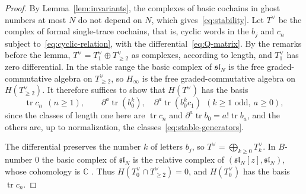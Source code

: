 \documentclass[11pt]{amsart}
\numberwithin{equation}{section}
\theoremstyle{definition}
\theoremstyle{remark}
\newcommand{\C}{\mathbb{C}}
\newcommand{\dd}{\partial}
\begin{document}
\begin{proof}
By Lemma~\ref{lem:invariants}, the complexes of basic cochains in ghost numbers at most $N$ do not depend on $N$, which gives~\eqref{eq:stability}. Let $T^\vee$ be the complex of formal single-trace cochains, that is, cyclic words in the $b_j$ and $c_n$ subject to~\eqref{eq:cyclic-relation}, with the differential~\eqref{eq:Q-matrix}. By the remarks before the lemma, $T^\vee=T^\vee_1\oplus T^\vee_{\ge2}$ as complexes, according to length, and $T^\vee_1$ has zero differential. In the stable range the basic complex of $\mathfrak{sl}_N$ is the free graded-commutative algebra on $T^\vee_{\ge2}$, so $H_\infty$ is the free graded-commutative algebra on $H(T^\vee_{\ge2})$. It therefore suffices to show that $H(T^\vee)$ has the basis
\begin{equation}\label{eq:single-trace-basis}
\operatorname{tr}c_n\ \ (n\ge1),\qquad \dd^a\operatorname{tr}(b_0^k),\quad\dd^a\operatorname{tr}(b_0^kc_1)\ \ (k\ge1\text{ odd},\ a\ge0),
\end{equation}
since the classes of length one here are $\operatorname{tr}c_n$ and $\dd^a\operatorname{tr}b_0=a!\operatorname{tr}b_a$, and the others are, up to normalization, the classes~\eqref{eq:stable-generators}.

The differential preserves the number $k$ of letters $b_j$, so $T^\vee=\bigoplus_{k\ge0}T^\vee_k$. In $B$-number $0$ the basic complex of $\mathfrak{sl}_N$ is the relative complex of $(\mathfrak{sl}_N[z],\mathfrak{sl}_N)$, whose cohomology is $\C$ \cite{GL76}. Thus $H(T^\vee_0\cap T^\vee_{\ge2})=0$, and $H(T^\vee_0)$ has the basis $\operatorname{tr}c_n$.


\end{proof}
\end{document}
